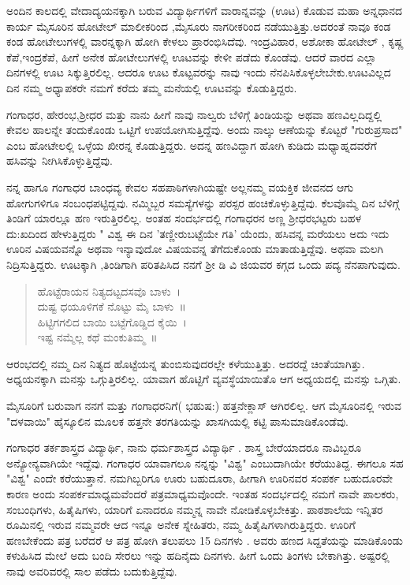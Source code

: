 {ಅಂದಿನ ಕಾಲದಲ್ಲಿ ವೇದಾದ್ಯಯನಕ್ಕಾಗಿ ಬರುವ ವಿದ್ಯಾರ್ಥಿಗಳಿಗೆ ವಾರಾನ್ನವನ್ನು (ಊಟ) ಕೊಡುವ ಮಹಾ ಅನ್ನಧಾನದ ಕಾರ್ಯ ಮೈಸೂರಿನ ಹೋಟೇಲ್ ಮಾಲೀಕರಿಂದ ,ಮೈಸೂರು ನಾಗರೀಕರಿಂದ ನಡೆಯುತ್ತಿತ್ತು.ಅದರಂತೆ ನಾವೂ ಕಂಡ   \enginline{-}  ಕಂಡ  ಹೋಟೇಲುಗಳಲ್ಲಿ ವಾರನ್ನಕ್ಕಾಗಿ ಹೋಗಿ ಕೇಳಲು ಪ್ರಾರಂಭಿಸಿದೆವು. ಇಂದ್ರವಿಹಾರ, ಅಶೋಕಾ ಹೋಟೇಲ್ , ಕೃಷ್ಣ ಕೆಪೆ,ಇಂದ್ರಕೆಪೆ, ಹೀಗೆ ಅನೇಕ ಹೋಟೇಲುಗಳಲ್ಲಿ ಊಟವನ್ನು ಕೇಳೀ ಪಡೆದು ಕೊಂಡೆವು. ಆದರೆ ವಾರದ ಎಲ್ಲಾ ದಿನಗಳಲ್ಲಿ ಊಟ ಸಿಕ್ಕುತ್ತಿರಲಿಲ್ಲ. ಆದರೂ ಊಟ ಕೊಟ್ಟವರನ್ನು ನಾವು ಇಂದು ನೆನಪಿಸಿಕೊಳ್ಳಲೇಬೇಕು.ಊಟವಿಲ್ಲದ ದಿನ ನಮ್ಮ ಅಧ್ಯಾಪಕರೇ ನಮಗೆ ಕರೆದು ತಮ್ಮ ಮನೆಯಲ್ಲಿ ಊಟವನ್ನು ಕೊಡುತ್ತಿದ್ದರು. 

ಗಂಗಾಧರ, ಹೇರಂಭ,ಶ್ರೀಧರ ಮತ್ತು ನಾನು ಹೀಗೆ ನಾವು ನಾಲ್ವರು ಬೆಳಿಗ್ಗೆ ತಿಂಡಿಯನ್ನು ಅಥವಾ ಹಣವಿಲ್ಲದಿದ್ದಲ್ಲಿ ಕೇವಲ   ಹಾಲನ್ನೇ ತಂದುಕೊಂಡು ಒಟ್ಟಿಗೆ ಉಪಯೋಗಿಸುತ್ತಿದ್ದೆವು. ಅಂದು ನಾಲ್ಕು ಆಣೆಯನ್ನು ಕೊಟ್ಟರೆ "ಗುರುಪ್ರಸಾದ" ಎಂಬ ಹೋಟೇಲಲ್ಲಿ  ಒಳ್ಳೆಯ ಖೀರನ್ನ ಕೊಡುತ್ತಿದ್ದರು. ಅದನ್ನ ಹಣವಿದ್ದಾಗ ಹೋಗಿ ಕುಡಿದು ಮಧ್ಯಾಹ್ನದವರೆಗೆ ಹಸಿವನ್ನು ನೀಗಿಸಿಕೊಳ್ಳುತ್ತಿದ್ದೆವು. 

ನನ್ನ ಹಾಗೂ ಗಂಗಾಧರ ಬಾಂಧವ್ಯ ಕೇವಲ ಸಹಪಾಠಿಗಳಾಗಿಯಷ್ಟೇ ಅಲ್ಲನಮ್ಮ ವಯಕ್ತಿಕ ಜೀವನದ ಆಗು ಹೋಗುಗಳಿಗೂ  ಸಂಬಂಧಪಟ್ಟಿದ್ದವು. ನಮ್ಮಿಬ್ಬರ ಸಮಸ್ಯೆಗಳನ್ನು ಪರಸ್ಪರ ಹಂಚಿಕೊಳ್ಳುತ್ತಿದ್ದೆವು. ಕೆಲವೊಮ್ಮೆ ದಿನ ಬೆಳಿಗ್ಗೆ ತಿಂಡಿಗೆ ಯಾರಲ್ಲೂ ಹಣ ಇರುತ್ತಿರಲಿಲ್ಲ. ಅಂತಹ ಸಂದರ್ಭದಲ್ಲಿ ಗಂಗಾಧರನ ಅಣ್ಣ ಶ್ರೀಧರಭಟ್ಟರು ಬಹಳ ದು:ಖದಿಂದ ಹೇಳುತ್ತಿದ್ದರು  \enginline{-}  " ವಿಶ್ವ ಈ ದಿನ 'ತಣ್ಣೀರುಬಟ್ಟೆಯೇ ಗತಿ' ಯೆಂದು, ಹಸಿವನ್ನ ಮರೆಯಲು ಅದು  \enginline{-}  ಇದು ಊರಿನ ವಿಷಯವನ್ನೊ ಅಥವಾ ಇನ್ಯಾವುದೋ ವಿಷಯವನ್ನ ತೆಗೆದುಕೊಂಡು ಮಾತಾಡುತ್ತಿದ್ದೆವು. ಅಥವಾ ಮಲಗಿ ನಿದ್ರಿಸುತ್ತಿದ್ದರು. ಊಟಕ್ಕಾಗಿ ,ತಿಂಡಿಗಾಗಿ ಪರಿತಪಿಸಿದ ನನಗೆ ಶ್ರೀ ಡಿ ವಿ ಜಿಯವರ ಕಗ್ಗದ ಒಂದು ಪದ್ಯ ನೆನಪಾಗುವುದು. 

\begin{verse}
ಹೊಟ್ಟೆರಾಯನ ನಿತ್ಯದಟ್ಟದಸವೊ ಬಾಳು~। \\
ದುಷ್ಟ ಧಯೂಳಿಗಕೆ ನೊಟ್ಟು ಮೈ ಬಾಳು~॥ \\
ಹಿಟ್ಟಿಗಗಲಿದ ಬಾಯಿ ಬಟ್ಟೆಗೊಡ್ಡಿದ ಕೈಯಿ~। \\
ಇಷ್ಟ ನಮ್ಮೆಲ್ಲ  ಕಥೆ ಮಂಕುತಿಮ್ಮ~॥ 
\end{verse}

ಆರಂಭದಲ್ಲಿ ನಮ್ಮ ದಿನ ನಿತ್ಯದ ಹೊಟ್ಟೆಯನ್ನ ತುಂಬಿಸುವುದರಲ್ಲೇ ಕಳೆಯುತ್ತಿತ್ತು. ಅದರದ್ದೆ ಚಿಂತೆಯಾಗಿತ್ತು.  ಅಧ್ಯಯನಕ್ಕಾಗಿ ಮನಸ್ಸು ಒಗ್ಗುತ್ತಿರಲಿಲ್ಲ. ಯಾವಾಗ ಹೊಟ್ಟಿಗೆ  ವ್ಯವಸ್ಥೆಯಾಯಿತೊ ಆಗ ಅಧ್ಯಯದಲ್ಲಿ ಮನಸ್ಸು  ಒಗ್ಗಿತು. 

ಮೈಸೂರಿಗೆ ಬರುವಾಗ ನನಗೆ ಮತ್ತು ಗಂಗಾಧರನಿಗೆ( ಭಹುಷ:) ಹತ್ತನೇಕ್ಲಾಸ್ ಆಗಿರಲಿಲ್ಲ. ಆಗ ಮೈಸೂರಿನಲ್ಲಿ ಇರುವ "ದಳವಾಯಿ" ಹೈಸ್ಕೂಲಿನ ಮೂಲಕ ಹತ್ತನೇ ತರಗತಿಯನ್ನು ಖಾಸಗಿಯಲ್ಲಿ ಕಟ್ಟಿ ಪಾಸುಮಾಡಿಕೊಂಡೆವು. 

ಗಂಗಾಧರ ತರ್ಕಶಾಸ್ತ್ರದ ವಿದ್ಯಾರ್ಥಿ, ನಾನು ಧರ್ಮಶಾಸ್ತ್ರದ ವಿದ್ಯಾರ್ಥಿ . ಶಾಸ್ತ್ರ ಬೇರೆಯಾದರೂ ನಾವಿಬ್ಬರೂ ಅನ್ಯೋನ್ಯವಾಗಿಯೇ ಇದ್ದೆವು. ಗಂಗಾಧರ ಯಾವಾಗಲೂ ನನ್ನನ್ನು "ವಿಶ್ವ" ಎಂಬುದಾಗಿಯೇ ಕರೆಯುತಿದ್ದ. ಈಗಲೂ ಸಹ "ವಿಶ್ವ" ಎಂದೇ ಕರೆಯುತ್ತಾನೆ. ನಮಗಿಬ್ಬರಿಗೂ ಊರು ಬಹುದೂರಾ, ಹೀಗಾಗಿ ಊರಿನವರ ಸಂಪರ್ಕ ಬಹುದೂರವೇ ಕಾರಣ ಅಂದು  ಸಂಪರ್ಕಮಾಧ್ಯಮವೆಂದರೆ ಪತ್ರಮಾಧ್ಯಮವೊಂದೇ. ಇಂತಹ ಸಂದರ್ಭದಲ್ಲಿ ನಮಗೆ ನಾವೇ ಪಾಲಕರು, ಸಂಬಂಧಿಗಳು, ಹಿತೈಷಿಗಳು, ಯಾರಿಗೆ ಏನಾದರೂ ನಮ್ಮನ್ನ  ನಾವೇ ನೋಡಿಕೊಳ್ಳಬೇಕಿತ್ತು.  ಪಾಠಶಾಲೆಯ ಇನ್ನಿತರ  ರೂಮಿನಲ್ಲಿ  ಇರುವ ನಮ್ಮವರೇ ಆದ ಇನ್ನೂ ಅನೇಕ ಸ್ನೇಹಿತರು, ನಮ್ಮ ಹಿತೈಷಿಗಳಾಗಿರುತ್ತಿದ್ದರು.  ಊರಿಗೆ ಹಣಬೇಕೆಂದು ಪತ್ರ ಬರೆದರೆ ಆ ಪತ್ರ ಹೋಗಿ ತಲುಪಲು 15 ದಿನಗಳು . ಅವರು ಹಣದ ಸಿದ್ದತೆಯನ್ನು ಮಾಡಿಕೊಂಡು  ಕಳುಹಿಸಿದ ಮೇಲೆ ಅದು ಬಂದಿ ಸೇರಲು ಇನ್ನು ಹದಿನೈದು    ದಿನಗಳು. ಹೀಗೆ ಒಂದು ತಿಂಗಳು ಬೇಕಾಗಿತ್ತು.  ಅಷ್ಟರಲ್ಲಿ ನಾವು ಅವರಿವರಲ್ಲಿ ಸಾಲ ಪಡೆದು ಬದುಕುತ್ತಿದ್ದೆವು. 

}
